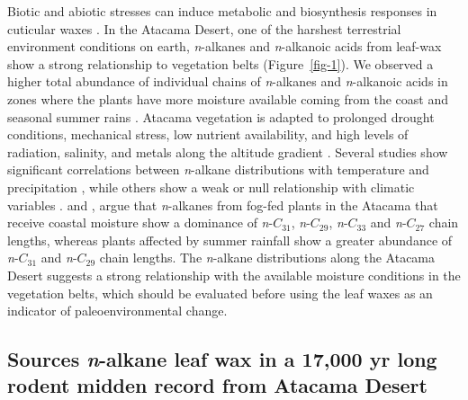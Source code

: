 \documentclass[
  authoryear,
  preprint,
  3p]{elsarticle}
\begin{document}
Biotic and abiotic stresses can induce metabolic and biosynthesis
responses in cuticular waxes
\citep{shepherdEffectsStressPlant2006, lewandowskaWaxBiosynthesisResponse2020}.
In the Atacama Desert, one of the harshest terrestrial environment
conditions on earth, \emph{n}-alkanes and \emph{n}-alkanoic acids from
leaf-wax show a strong relationship to vegetation belts
(Figure~\ref{fig-1}). We observed a higher total abundance of individual
chains of \emph{n}-alkanes and \emph{n}-alkanoic acids in zones where
the plants have more moisture available coming from the coast and
seasonal summer rains \citep{arroyoEffectsAridityPlant1988}. Atacama
vegetation is adapted to prolonged drought conditions, mechanical
stress, low nutrient availability, and high levels of radiation,
salinity, and metals along the altitude gradient
\citep{diazNitrogenCyclingExtreme2016, rondanelliAtacamaSurfaceSolar2015, eshelPlantEcologicalGenomics2021}.
Several studies show significant correlations between \emph{n}-alkane
distributions with temperature and precipitation
\citep{hoffmannAbundanceDistributionLeaf2013, tippleEnvironmentalControlEastern2013, feakinsProductionLeafWax2016, wangTemperatureEffectAbundance2018},
while others show a weak or null relationship with climatic variables
\citep{carrLeafWaxNalkane2014, howardModellingLeafWax2018}.
\citet{morchenFingerprintPlantLife2021} and
\citet{contrerasLeafWaxComposition2022}, argue that \emph{n}-alkanes
from fog-fed plants in the Atacama that receive coastal moisture show a
dominance of \emph{n}-\(C_{31}\), \emph{n}-\(C_{29}\),
\emph{n}-\(C_{33}\) and \emph{n}-\(C_{27}\) chain lengths, whereas
plants affected by summer rainfall show a greater abundance of
\emph{n}-\(C_{31}\) and \emph{n}-\(C_{29}\) chain lengths. The
\emph{n}-alkane distributions along the Atacama Desert suggests a strong
relationship with the available moisture conditions in the vegetation
belts, which should be evaluated before using the leaf waxes as an
indicator of paleoenvironmental change.

\hypertarget{sources-n-alkane-leaf-wax-in-a-17000-yr-long-rodent-midden-record-from-atacama-desert}{%
\subsection{\texorpdfstring{Sources \emph{n}-alkane leaf wax in a 17,000
yr long rodent midden record from Atacama
Desert}{Sources n-alkane leaf wax in a 17,000 yr long rodent midden record from Atacama Desert}}\label{sources-n-alkane-leaf-wax-in-a-17000-yr-long-rodent-midden-record-from-atacama-desert}}
\end{document}
